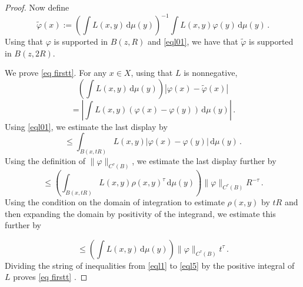 {\begin{proof}
Now define
    $$
        \tilde \varphi(x) := \left(\int L(x,y) \, \mathrm{d}\mu(y)\right)^{-1}\int L(x,y) \varphi(y) \, \mathrm{d}\mu(y)\, .
    $$
Using that $\varphi$ is supported in $B(z,R)$ and
\eqref{eql01}, we have that $\tilde{\varphi}$ is supported in $B(z,2R)$.

We prove \eqref{eq firstt}.
 For any $x\in X$, using
    that $L$ is nonnegative,
    \begin{equation}\label{eql1}
    \left(\int L(x,y) \, \mathrm{d}\mu(y)\right)
        |\varphi(x) - \tilde \varphi(x)|
    \end{equation}
 \begin{equation}\label{eql2}
 = \left| \int L(x,y)(\varphi(x) - \varphi(y)) \, \mathrm{d}\mu(y)\right|\, .
    \end{equation}
Using \eqref{eql01}, we estimate the last display by
 \begin{equation}\label{eql3}
         \le   \int_{B(x, tR)} L(x,y)|\varphi(x) - \varphi(y)| \, \mathrm{d}\mu(y)\, .\end{equation}
  Using the definition of $\|\varphi\|_{C^\tau(B)}$, we estimate the last display further by
        \begin{equation}\label{eql4}
         \le   \left(\int_{B(x, tR)} L(x,y)
          \rho(x,y)^\tau \, \mathrm{d}\mu(y) \right)\|\varphi\|_{C^\tau(B)}R^{-\tau}\, .
    \end{equation}
  Using the condition on the domain of integration to estimate $\rho(x,y)$ by $tR$ and then expanding the domain by positivity of the integrand, we estimate this further by

    \begin{equation}\label{eql5}
         \le   \left(\int L(x,y) \, \mathrm{d}\mu(y)\right)
         \|\varphi\|_{C^\tau(B)} t^{\tau} \, .
    \end{equation}
 Dividing the string of inequalities from \eqref{eql1} to
\eqref{eql5} by the positive integral of $L$ proves \eqref{eq firstt} .



\end{proof}}
